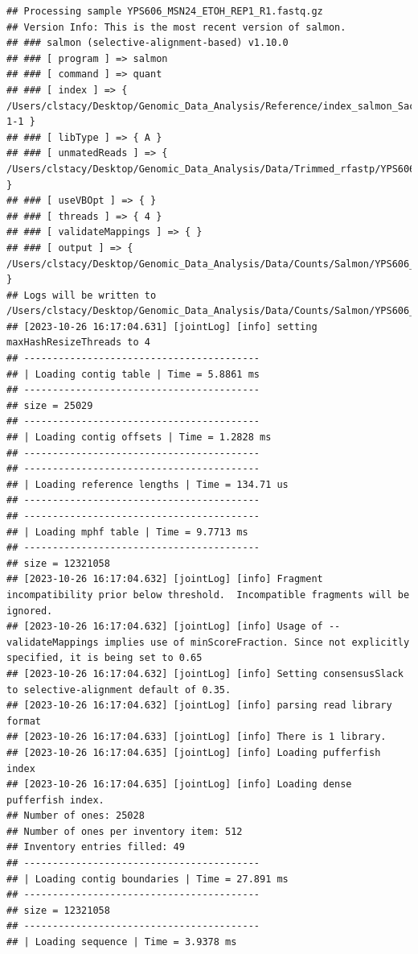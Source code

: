 \documentclass[
]{book}
\begin{document}
\begin{verbatim}
## Processing sample YPS606_MSN24_ETOH_REP1_R1.fastq.gz
## Version Info: This is the most recent version of salmon.
## ### salmon (selective-alignment-based) v1.10.0
## ### [ program ] => salmon 
## ### [ command ] => quant 
## ### [ index ] => { /Users/clstacy/Desktop/Genomic_Data_Analysis/Reference/index_salmon_Saccharomyces_cerevisiae.R64-1-1 }
## ### [ libType ] => { A }
## ### [ unmatedReads ] => { /Users/clstacy/Desktop/Genomic_Data_Analysis/Data/Trimmed_rfastp/YPS606_MSN24_ETOH_REP1_R1.fastq.gz }
## ### [ useVBOpt ] => { }
## ### [ threads ] => { 4 }
## ### [ validateMappings ] => { }
## ### [ output ] => { /Users/clstacy/Desktop/Genomic_Data_Analysis/Data/Counts/Salmon/YPS606_MSN24_ETOH_REP1_R1.fastq.gz_quant }
## Logs will be written to /Users/clstacy/Desktop/Genomic_Data_Analysis/Data/Counts/Salmon/YPS606_MSN24_ETOH_REP1_R1.fastq.gz_quant/logs
## [2023-10-26 16:17:04.631] [jointLog] [info] setting maxHashResizeThreads to 4
## -----------------------------------------
## | Loading contig table | Time = 5.8861 ms
## -----------------------------------------
## size = 25029
## -----------------------------------------
## | Loading contig offsets | Time = 1.2828 ms
## -----------------------------------------
## -----------------------------------------
## | Loading reference lengths | Time = 134.71 us
## -----------------------------------------
## -----------------------------------------
## | Loading mphf table | Time = 9.7713 ms
## -----------------------------------------
## size = 12321058
## [2023-10-26 16:17:04.632] [jointLog] [info] Fragment incompatibility prior below threshold.  Incompatible fragments will be ignored.
## [2023-10-26 16:17:04.632] [jointLog] [info] Usage of --validateMappings implies use of minScoreFraction. Since not explicitly specified, it is being set to 0.65
## [2023-10-26 16:17:04.632] [jointLog] [info] Setting consensusSlack to selective-alignment default of 0.35.
## [2023-10-26 16:17:04.632] [jointLog] [info] parsing read library format
## [2023-10-26 16:17:04.633] [jointLog] [info] There is 1 library.
## [2023-10-26 16:17:04.635] [jointLog] [info] Loading pufferfish index
## [2023-10-26 16:17:04.635] [jointLog] [info] Loading dense pufferfish index.
## Number of ones: 25028
## Number of ones per inventory item: 512
## Inventory entries filled: 49
## -----------------------------------------
## | Loading contig boundaries | Time = 27.891 ms
## -----------------------------------------
## size = 12321058
## -----------------------------------------
## | Loading sequence | Time = 3.9378 ms

\end{verbatim}
\end{document}
